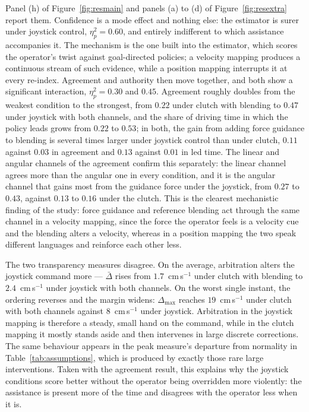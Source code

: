Panel (h) of Figure~\ref{fig:resmain} and panels (a) to (d) of Figure~\ref{fig:resextra} report them. Confidence is a mode effect and nothing else: the estimator is surer under joystick control, $\eta^2_p = 0.60$, and entirely indifferent to which assistance accompanies it. The mechanism is the one built into the estimator, which scores the operator's twist against goal-directed policies; a velocity mapping produces a continuous stream of such evidence, while a position mapping interrupts it at every re-index. Agreement and authority then move together, and both show a significant interaction, $\eta^2_p = 0.30$ and $0.45$. Agreement roughly doubles from the weakest condition to the strongest, from $0.22$ under clutch with blending to $0.47$ under joystick with both channels, and the share of driving time in which the policy leads grows from $0.22$ to $0.53$; in both, the gain from adding force guidance to blending is several times larger under joystick control than under clutch, $0.11$ against $0.03$ in agreement and $0.13$ against $0.01$ in led time. The linear and angular channels of the agreement confirm this separately: the linear channel agrees more than the angular one in every condition, and it is the angular channel that gains most from the guidance force under the joystick, from $0.27$ to $0.43$, against $0.13$ to $0.16$ under the clutch. This is the clearest mechanistic finding of the study: force guidance and reference blending act through the same channel in a velocity mapping, since the force the operator feels is a velocity cue and the blending alters a velocity, whereas in a position mapping the two speak different languages and reinforce each other less.

The two transparency measures disagree. On the average, arbitration alters the joystick command more --- $\bar{\Delta}$ rises from $1.7$~cm\,s$^{-1}$ under clutch with blending to $2.4$~cm\,s$^{-1}$ under joystick with both channels. On the worst single instant, the ordering reverses and the margin widens: $\Delta_{\max}$ reaches $19$~cm\,s$^{-1}$ under clutch with both channels against $8$~cm\,s$^{-1}$ under joystick. Arbitration in the joystick mapping is therefore a steady, small hand on the command, while in the clutch mapping it mostly stands aside and then intervenes in large discrete corrections. The same behaviour appears in the peak measure's departure from normality in Table~\ref{tab:assumptions}, which is produced by exactly those rare large interventions. Taken with the agreement result, this explains why the joystick conditions score better without the operator being overridden more violently: the assistance is present more of the time and disagrees with the operator less when it is.



